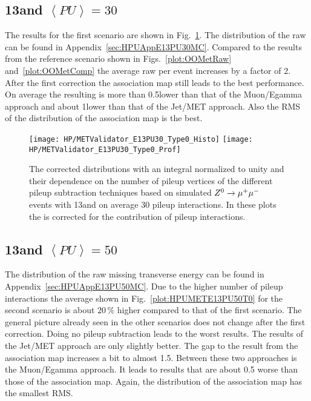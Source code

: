 \subsection{13\TeV and $\left<PU\right> =30$ \label{sec:HPUMETE13PU30}}

The results for the first scenario are shown in Fig.~\ref{plot:HPUMETE13PU30T0}. The distribution of the raw \MET{} can be found in Appendix~\ref{sec:HPUAppE13PU30MC}. Compared to the results from the reference scenario shown in Figs.~\ref{plot:OOMetRaw} and~\ref{plot:OOMetComp} the average raw \MET{} per event increases by a factor of 2. After the first correction the association map still leads to the best performance. On average the resulting \MET{} is more than 0.5\GeV lower than that of the Muon/Egamma approach and about 1\GeV lower than that of the Jet/MET approach. Also the RMS of the distribution of the association map is the best.

\begin{figure}[Ht]
  \centering
  \texttt{[image: HP/METValidator\_E13PU30\_Type0\_Histo]}
  \texttt{[image: HP/METValidator\_E13PU30\_Type0\_Prof]}
  \caption[The corrected \MET{} distributions and their dependence on the number of pileup vertices for different pileup subtraction techniques based on simulated  $\Zz\rightarrow\MM$ events with 13\TeV and $\left<PU\right>=30$]{The corrected \MET{} distributions with an integral normalized to unity and their dependence on the number of pileup vertices of the different pileup subtraction techniques based on simulated  $\Zz\rightarrow\MM$ events with 13\TeV and on average 30 pileup interactions. In these plots the \MET{} is corrected for the contribution of pileup interactions. \label{plot:HPUMETE13PU30T0}}
\end{figure}

\subsection{13\TeV and $\left<PU\right> =50$ \label{sec:HPUMETE13PU50}}

The distribution of the raw missing transverse energy can be found in Appendix~\ref{sec:HPUAppE13PU50MC}. Due to the higher number of pileup interactions the average \MET{} shown in Fig.~\ref{plot:HPUMETE13PU50T0} for the second scenario is about $20\,\%$ higher compared to that of the first scenario. The general picture already seen in the other scenarios does not change after the first correction. Doing no pileup subtraction leads to the worst results. The results of the Jet/MET approach are only slightly better. The gap to the result from the association map increases a bit to almost 1.5\GeV{}. Between these two approaches is the Muon/Egamma approach. It leads to results that are about 0.5\GeV{} worse than those of the association map. Again, the distribution of the association map has the smallest RMS.

